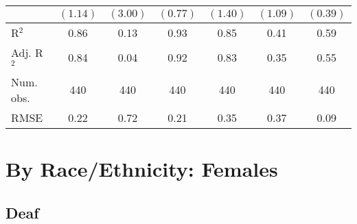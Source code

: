 \documentclass[fullpage]{paper}
\begin{document}
\begin{center}
\begin{longtable}{l c c c c c c }
            & $(1.14)$      & $(3.00)$      & $(0.77)$       & $(1.40)$       & $(1.09)$      & $(0.39)$      \\
\hline
R$^2$       & 0.86          & 0.13          & 0.93           & 0.85           & 0.41          & 0.59          \\
Adj. R$^2$  & 0.84          & 0.04          & 0.92           & 0.83           & 0.35          & 0.55          \\
Num. obs.   & 440           & 440           & 440            & 440            & 440           & 440           \\
RMSE        & 0.22          & 0.72          & 0.21           & 0.35           & 0.37          & 0.09          \\
\end{longtable}
\end{center}
\section{ By Race/Ethnicity: Females }

\subsection{ Deaf }
\end{document}

